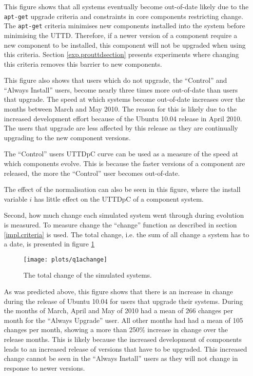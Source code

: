 This figure shows that all systems eventually become out-of-date likely due to the \texttt{apt-get} upgrade criteria and constraints in core components restricting change.
The \texttt{apt-get} criteria minimises new components installed into the system before minimising the UTTD.
Therefore, if a newer version of a component require a new component to be installed, this component will not be upgraded when using this criteria.
Section \ref{exp.prouttdsection} presents experiments where changing this criteria removes this barrier to new components. 

This figure also shows that users which do not upgrade, the ``Control'' and ``Always Install'' users, become nearly three times more out-of-date than users that upgrade.
The speed at which systems become out-of-date increases over the months between March and May 2010.
The reason for this is likely due to the increased development effort because of the Ubuntu 10.04 release in April 2010.
The users that upgrade are less affected by this release as they are continually upgrading to the new component versions.

The ``Control'' users UTTDpC curve can be used as a measure of the speed at which components evolve.
This is because the faster versions of a component are released, the more the ``Control'' user becomes out-of-date.

The effect of the normalisation can also be seen in this figure, where the install variable $i$ has little effect on the UTTDpC of a component system.

Second, how much change each simulated system went through during evolution is measured.
To measure change the ``change'' function as described in section \ref{impl.criteria} is used.
The total change, i.e. the sum of all change a system has to a date, is presented in figure \ref{exp.q1achange}
\begin{figure}[htp]
\begin{center}
  \texttt{[image: plots/q1achange]}
  \caption{The total change of the simulated systems.}
  \label{exp.q1achange}
\end{center}
\end{figure}

As was predicted above, this figure shows that there is an increase in change during the release of Ubuntu 10.04 for users that upgrade their systems.
During the months of March, April and May of 2010 had a mean of 266 changes per month for the ``Always Upgrade'' user.
All other months had had a mean of 105 changes per month, showing a more than 250\% increase in change over the release months.
This is likely because the increased development of components leads to an increased release of versions that have to be upgraded.
This increased change cannot be seen in the ``Always Install'' users as they will not change in response to newer versions.

